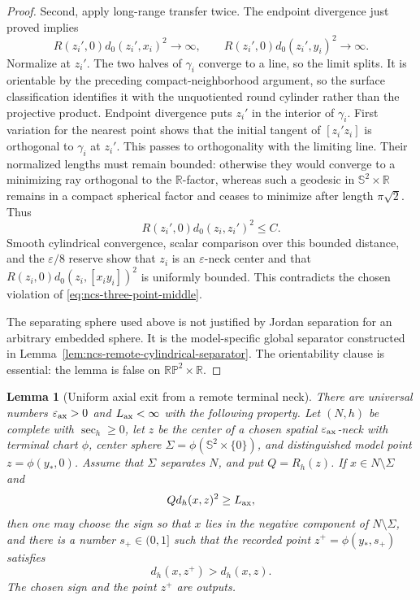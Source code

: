 \documentclass[10pt]{coll-l}
\newcommand{\R}{\mathbb{R}}
\newcommand{\Sph}{\mathbb{S}}
\newtheorem{lemma}[theorem]{Lemma}
\theoremstyle{definition}
\theoremstyle{remark}
\numberwithin{section}{chapter}
\numberwithin{equation}{chapter}
\begin{document}
\begin{proof}
Second, apply long-range transfer twice.  The endpoint divergence just
proved implies
\begin{equation}
 R(z_i',0)d_0(z_i',x_i)^2\to\infty,\qquad
 R(z_i',0)d_0(z_i',y_i)^2\to\infty.                    \label{eq:ncs-zprime-two-long-sides}
\end{equation}
Normalize at $z_i'$.  The two halves of $\gamma_i$ converge to a line, so
the limit splits.  It is orientable by the preceding compact-neighborhood
argument, so the surface classification identifies it with the
unquotiented round cylinder rather than the projective product.  Endpoint
divergence puts $z_i'$ in the interior of $\gamma_i$.  First variation for
the nearest point shows that the initial tangent of $[z_i'z_i]$ is
orthogonal to $\gamma_i$ at $z_i'$.  This passes to orthogonality with the
limiting line.  Their normalized lengths must remain bounded:
otherwise they would converge to a minimizing ray orthogonal to the
$\R$-factor, whereas such a geodesic in
$\Sph^2\times\R$ remains in a compact spherical factor and ceases to
minimize after length $\pi\sqrt2$.  Thus
\begin{equation}
 R(z_i',0)d_0(z_i,z_i')^2\leq C.                       \label{eq:ncs-normal-distance-zprime}
\end{equation}
Smooth cylindrical convergence, scalar comparison over this bounded
distance, and the $\varepsilon/8$ reserve show that $z_i$ is an
$\varepsilon$-neck center and that
$R(z_i,0)d_0(z_i,[x_iy_i])^2$ is uniformly bounded.  This contradicts the
chosen violation of \eqref{eq:ncs-three-point-middle}.

The separating sphere used above is not justified by Jordan separation for
an arbitrary embedded sphere.  It is the model-specific global separator
constructed in Lemma~\ref{lem:ncs-remote-cylindrical-separator}.  The
orientability clause is essential: the lemma is false on
$\mathbb{RP}^2\times\R$.
\end{proof}

\begin{lemma}[Uniform axial exit from a remote terminal neck]
\label{lem:ncs-remote-axial-exit}
There are universal numbers $\varepsilon_{\rm ax}>0$ and
$L_{\rm ax}<\infty$ with the following property.  Let $(N,h)$ be complete
with $\sec_h\geq0$, let $z$ be the center of a chosen spatial
$\varepsilon_{\rm ax}$-neck with terminal chart $\phi$, center sphere
$\Sigma=\phi(\Sph^2\times\{0\})$, and distinguished model point
$z=\phi(y_*,0)$.  Assume that
$\Sigma$ separates $N$, and put $Q=R_h(z)$.  If $x\in N\setminus\Sigma$
and
\begin{equation}
                         Qd_h(x,z)^2\geq L_{\rm ax},    \label{eq:ncs-remote-axial-exit-hypothesis}
\end{equation}
then one may choose the sign so that $x$ lies in the negative component of
$N\setminus\Sigma$, and there is a number $s_+\in(0,1]$ such that the
recorded point $z^+=\phi(y_*,s_+)$ satisfies
\begin{equation}
                              d_h(x,z^+)>d_h(x,z).      \label{eq:ncs-remote-axial-exit-conclusion}
\end{equation}
The chosen sign and the point $z^+$ are outputs.
\end{lemma}
\end{document}
